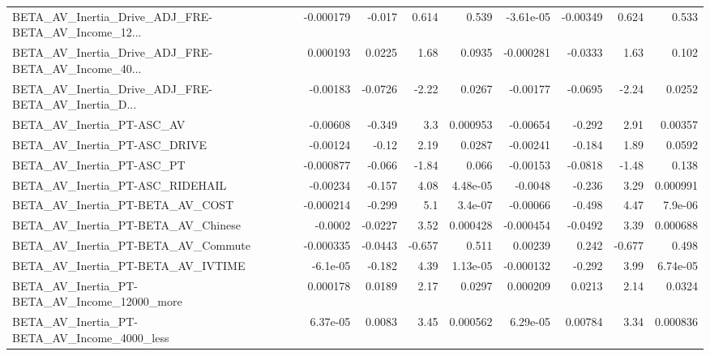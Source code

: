 \begin{tabular}{lrrrrrrrr}
BETA\_AV\_Inertia\_Drive\_ADJ\_FRE-BETA\_AV\_Income\_12... &   -0.000179 &       -0.017 &    0.614 &    0.539 &  -3.61e-05 &    -0.00349 &        0.624 &         0.533 \\
BETA\_AV\_Inertia\_Drive\_ADJ\_FRE-BETA\_AV\_Income\_40... &    0.000193 &       0.0225 &     1.68 &   0.0935 &  -0.000281 &     -0.0333 &         1.63 &         0.102 \\
BETA\_AV\_Inertia\_Drive\_ADJ\_FRE-BETA\_AV\_Inertia\_D... &    -0.00183 &      -0.0726 &    -2.22 &   0.0267 &   -0.00177 &     -0.0695 &        -2.24 &        0.0252 \\
BETA\_AV\_Inertia\_PT-ASC\_AV                          &    -0.00608 &       -0.349 &      3.3 & 0.000953 &   -0.00654 &      -0.292 &         2.91 &       0.00357 \\
BETA\_AV\_Inertia\_PT-ASC\_DRIVE                       &    -0.00124 &        -0.12 &     2.19 &   0.0287 &   -0.00241 &      -0.184 &         1.89 &        0.0592 \\
BETA\_AV\_Inertia\_PT-ASC\_PT                          &   -0.000877 &       -0.066 &    -1.84 &    0.066 &   -0.00153 &     -0.0818 &        -1.48 &         0.138 \\
BETA\_AV\_Inertia\_PT-ASC\_RIDEHAIL                    &    -0.00234 &       -0.157 &     4.08 & 4.48e-05 &    -0.0048 &      -0.236 &         3.29 &      0.000991 \\
BETA\_AV\_Inertia\_PT-BETA\_AV\_COST                    &   -0.000214 &       -0.299 &      5.1 &  3.4e-07 &   -0.00066 &      -0.498 &         4.47 &       7.9e-06 \\
BETA\_AV\_Inertia\_PT-BETA\_AV\_Chinese                 &     -0.0002 &      -0.0227 &     3.52 & 0.000428 &  -0.000454 &     -0.0492 &         3.39 &      0.000688 \\
BETA\_AV\_Inertia\_PT-BETA\_AV\_Commute                 &   -0.000335 &      -0.0443 &   -0.657 &    0.511 &    0.00239 &       0.242 &       -0.677 &         0.498 \\
BETA\_AV\_Inertia\_PT-BETA\_AV\_IVTIME                  &    -6.1e-05 &       -0.182 &     4.39 & 1.13e-05 &  -0.000132 &      -0.292 &         3.99 &      6.74e-05 \\
BETA\_AV\_Inertia\_PT-BETA\_AV\_Income\_12000\_more       &    0.000178 &       0.0189 &     2.17 &   0.0297 &   0.000209 &      0.0213 &         2.14 &        0.0324 \\
BETA\_AV\_Inertia\_PT-BETA\_AV\_Income\_4000\_less        &    6.37e-05 &       0.0083 &     3.45 & 0.000562 &   6.29e-05 &     0.00784 &         3.34 &      0.000836 \\

\end{tabular}
